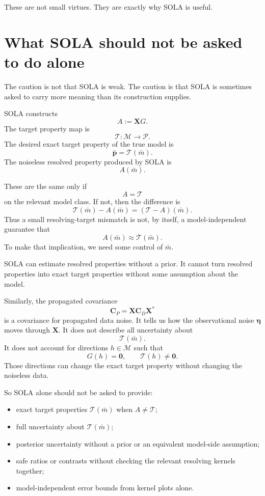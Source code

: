 \documentclass[11pt,openany]{book}
\theoremstyle{definition}
\theoremstyle{remark}
\newcommand{\M}{\mathcal M}
\newcommand{\Pspace}{\mathcal P}
\newcommand{\Tau}{\mathcal{T}}
\begin{document}
These are not small virtues. They are exactly why SOLA is useful.

\section{What SOLA should not be asked to do alone}

The caution is not that SOLA is weak. The caution is that SOLA is sometimes asked to carry
more meaning than its construction supplies.

SOLA constructs
\[
  A:=\mathbf XG.
\]
The target property map is
\[
  \Tau:\M\to\Pspace.
\]
The desired exact target property of the true model is
\[
  \bar{\mathbf p}
  =
  \Tau(\bar m).
\]
The noiseless resolved property produced by SOLA is
\[
  A(\bar m).
\]

These are the same only if
\[
  A=\Tau
\]
on the relevant model class. If not, then the difference is
\[
  \Tau(\bar m)-A(\bar m)
  =
  (\Tau-A)(\bar m).
\]
Thus a small resolving-target mismatch is not, by itself, a model-independent guarantee that
\[
  A(\bar m)\approx\Tau(\bar m).
\]
To make that implication, we need some control of \(\bar m\).

\begin{warningbox}
SOLA can estimate resolved properties without a prior. It cannot turn resolved properties into
exact target properties without some assumption about the model.
\end{warningbox}

Similarly, the propagated covariance
\[
  \mathbf C_P=\mathbf X\mathbf C_D\mathbf X^*
\]
is a covariance for propagated data noise. It tells us how the observational noise
\(\boldsymbol\eta\) moves through \(\mathbf X\). It does not describe all uncertainty about
\[
  \Tau(\bar m).
\]
It does not account for directions \(h\in\M\) such that
\[
  G(h)=\mathbf 0,
  \qquad
  \Tau(h)\neq\mathbf 0.
\]
Those directions can change the exact target property without changing the noiseless data.

So SOLA alone should not be asked to provide:

\begin{itemize}[leftmargin=*]
  \item exact target properties \(\Tau(\bar m)\) when \(A\neq\Tau\);
  \item full uncertainty about \(\Tau(\bar m)\);
  \item posterior uncertainty without a prior or an equivalent model-side assumption;
  \item safe ratios or contrasts without checking the relevant resolving kernels together;
  \item model-independent error bounds from kernel plots alone.
\end{itemize}
\end{document}
